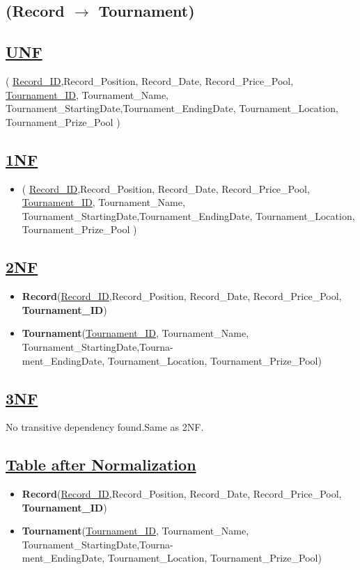 \subsection{\texorpdfstring{\centering (Record $\rightarrow$ Tournament)}{(Record - Tournament)}}

\subsection*{\underline{UNF}}
(
\underline{Record\_ID},Record\_Position, Record\_Date, Record\_Price\_Pool,
\underline{Tournament\_ID}, Tournament\_Name, Tournament\_StartingDate,Tournament\_EndingDate, Tournament\_Location, Tournament\_Prize\_Pool
)


\subsection*{\underline{1NF}}

\begin{itemize}
    \item
          (
          \underline{Record\_ID},Record\_Position, Record\_Date, Record\_Price\_Pool,
          \underline{Tournament\_ID}, Tournament\_Name, Tournament\_StartingDate,Tournament\_EndingDate, Tournament\_Location, Tournament\_Prize\_Pool
          )
\end{itemize}


\subsection*{\underline{2NF}}
\begin{itemize}
    \item \textbf{Record}(\underline{Record\_ID},Record\_Position, Record\_Date, Record\_Price\_Pool, \textbf{Tournament\_ID})
    \item \textbf{Tournament}(\underline{Tournament\_ID}, Tournament\_Name, Tournament\_StartingDate,Tourna-\\ment\_EndingDate, Tournament\_Location, Tournament\_Prize\_Pool)
\end{itemize}

\subsection*{\underline{3NF}}
No transitive dependency found.Same as 2NF.

\subsection*{\underline{Table after Normalization}}
\begin{itemize}
    \item \textbf{Record}(\underline{Record\_ID},Record\_Position, Record\_Date, Record\_Price\_Pool, \textbf{Tournament\_ID})
    \item \textbf{Tournament}(\underline{Tournament\_ID}, Tournament\_Name, Tournament\_StartingDate,Tourna-\\ment\_EndingDate, Tournament\_Location, Tournament\_Prize\_Pool)
\end{itemize}

\clearpage
